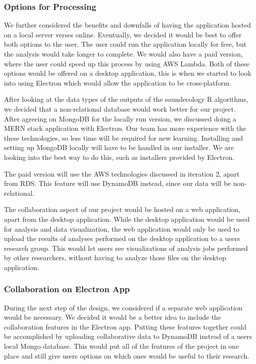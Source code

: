 \subsubsection{Options for Processing}
We further considered the benefits and downfalls of having the application hosted on a local server verses online. Eventually, we decided it would be best to offer both options to the user. The user could run the application locally for free, but the analysis would take longer to complete. We would also have a paid version, where the user could speed up this process by using AWS Lambda. Both of these options would be offered on a desktop application, this is when we started to look into using Electron which would allow the application to be cross-platform.\par
After looking at the data types of the outputs of the soundecology R algorithms, we decided that a non-relational database would work better for our project. After agreeing on MongoDB for the locally run version, we discussed doing a MERN stack application with Electron. Our team has more experience with the these technologies, so less time will be required for new learning. Installing and setting up MongoDB locally will have to be handled in our installer. We are looking into the best way to do this, such as installers provided by Electron.\par
The paid version will use the AWS technologies discussed in iteration 2, apart from RDS. This feature will use DynamoDB instead, since our data will be non-relational.\par
The collaboration aspect of our project would be hosted on a web application, apart from the desktop application. While the desktop application would be used for analysis and data visualization, the web application would only be used to upload the results of analyses performed on the desktop application to a user\textquotesingle s research group. This would let users see visualizations of analysis jobs performed by other researchers, without having to analyze those files on the desktop application.\par

\subsubsection{Collaboration on Electron App}
During the next step of the design, we considered if a separate web application would be necessary. We decided it would be a better idea to include the collaboration features in the Electron app. Putting these features together could be accomplished by uploading collaborative data to DynamoDB instead of a user\textquotesingle s local Mongo database. This would put all of the features of the project in one place and still give users options on which ones would be useful to their research.\par

